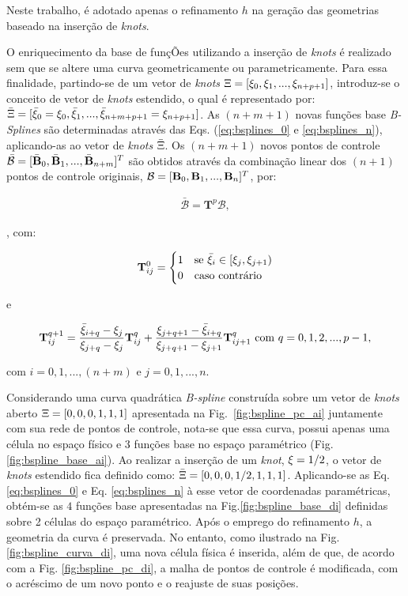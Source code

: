 \documentclass[tese_patricia]{subfiles}
\begin{document}
Neste trabalho, é adotado apenas o refinamento $h$ na geração das geometrias baseado na inserção de \textit{knots}.

O enriquecimento da base de funçÕes utilizando a inserção de \textit{knots} é realizado sem que se altere uma curva geometricamente ou parametricamente. Para essa finalidade, partindo-se de um vetor de \textit{knots} $\Xi = [\xi_0,\xi_1, ..., \xi_{n+p+1}]$, introduz-se o conceito de vetor de \textit{knots} estendido, o qual é representado por: $\bar{\Xi} = [\bar{\xi}_0 = \xi_0,\bar{\xi}_1, ..., \bar{\xi}_{n+m+p+1}= \xi_{n+p+1}]$. As $(n+m+1)$ novas funções base \textit{B-Splines} são determinadas através das Eqs. (\ref{eq:bsplines_0} e \ref{eq:bsplines_n}), aplicando-as ao vetor de \textit{knots} $\bar{\Xi}$. Os $(n+m+1)$ novos pontos de controle  $\bar{\mathcal{B}} = [\bar{\mathbf{B}}_0,\bar{\mathbf{B}}_1,..., \bar{\mathbf{B}}_{n+m}]^{T}$ são obtidos através da combinação linear dos $(n+1)$ pontos de controle originais, $\mathcal{B} = [\mathbf{B}_0,\mathbf{B}_1,..., \mathbf{B}_{n}]^{T}$, por:


\begin{align}
	\bar{\mathcal{B}} = \mathbf{T}^{p}\mathcal{B},
\end{align}

\noindent, com:

\begin{align}
	\mathbf{T}_{ij}^{0} = \begin{cases} 1 &\mbox{se } \bar{\xi}_i \in \left[\xi_j,\xi_{j+1}\right) \\
		0 & \mbox{caso contrário } \end{cases} 
\end{align}

\noindent e

\begin{align}
	\mathbf{T}_{ij}^{q+1} = \frac{\bar{\xi}_{i+q}-\xi_j}{\xi_{j+q}-\xi_j}\mathbf{T}_{ij}^{q} + \frac{\xi_{j+q+1}-\bar{\xi}_{i+q}}{\xi_{j+q+1}-\xi_{j+1}}\mathbf{T}_{ij+1}^{q} \ \text{com} \ q=0,1,2,...,p-1,
\end{align}

\noindent com $i=0,1,...,(n+m)$ e $j=0,1,...,n$.

Considerando uma curva quadrática \textit{B-spline} construída sobre um vetor de \textit{knots} aberto $\Xi=[0,0,0,1,1,1]$ apresentada na Fig.~\ref{fig:bspline_pc_ai} juntamente com sua rede de pontos de controle, nota-se que essa curva, possui apenas uma célula no espaço físico e $3$ funções base no espaço paramétrico (Fig. \ref{fig:bspline_base_ai}). Ao realizar a inserção de um \textit{knot}, $\xi=1/2$, o vetor de \textit{knots} estendido fica definido como: $\bar{\Xi}=[0,0,0,1/2,1,1,1]$. Aplicando-se as Eq. \ref{eq:bsplines_0} e Eq. \ref{eq:bsplines_n} à esse vetor de coordenadas paramétricas, obtém-se as $4$ funções base apresentadas na Fig.\ref{fig:bspline_base_di} definidas sobre 2 células do espaço paramétrico. Após o emprego do refinamento $h$, a geometria da curva é preservada. No entanto, como ilustrado na Fig. \ref{fig:bspline_curva_di}, uma nova célula física é inserida, além de que, de acordo com a Fig. \ref{fig:bspline_pc_di}, a malha de pontos de controle é modificada, com o acréscimo de um novo ponto e o reajuste de suas posições.
\end{document}
